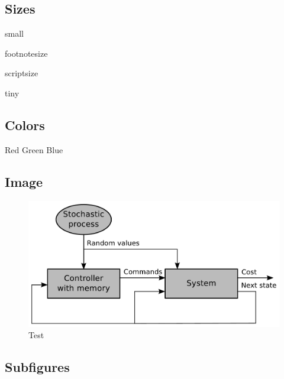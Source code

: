 \documentclass{article}
\begin{document}
\subsection{Sizes}\label{subsec:sizes}

\begin{small}
small
\end{small}

\begin{footnotesize}
footnotesize
\end{footnotesize}

\begin{scriptsize}
scriptsize
\end{scriptsize}

\begin{tiny}
tiny
\end{tiny}


\subsection{Colors}\label{subsec:colors}

{\color{red} Red}
{\color{green} Green}
{\color{blue} Blue}


\subsection{Image}\label{subsec:image}

\begin{figure}
    \centering
    \ifpdf
    \includegraphics[width=.80\linewidth]{fig/test.pdf}
    \else
    \fi
    \caption{\label{fig:test}Test}
\end{figure}


\subsection{Subfigures}\label{subsec:subfig}
\end{document}
